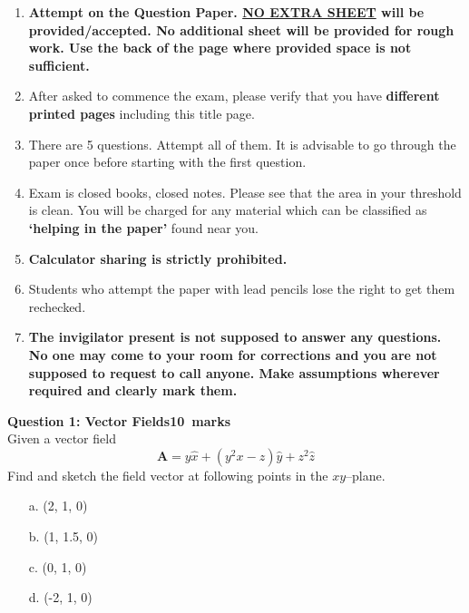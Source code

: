 \documentclass[12pt,a4paper]{article}
\def\QOne{10}
\begin{document}
\begin{enumerate}
\item \textbf{Attempt on the Question Paper. \underline{NO EXTRA SHEET} will be provided/accepted. No
additional sheet will be provided for rough work. Use the back of the page where
provided space is not sufficient.}
\item After asked to commence the exam, please verify that you have \textbf{\pageref{LastPage} different
printed pages} including this title page.
\item There are 5 questions. Attempt all of them. It is advisable to go through the paper once
before starting with the first question.
\item Exam is closed books, closed notes. Please see that the area in your threshold is clean.
You will be charged for any material which can be classified as \textbf{`helping in the paper'}
found near you.
\item \textbf{Calculator sharing is strictly prohibited.}
\item Students who attempt the paper with lead pencils lose the right to get them rechecked.
\item \textbf{The invigilator present is not supposed to answer any questions. No one may come
to your room for corrections and you are not supposed to request to call anyone.
Make assumptions wherever required and clearly mark them.}
\end{enumerate}
\newpage
\noindent\textbf{Question 1: Vector Fields\hfill \QOne~marks}\\
Given a vector field
\begin{equation*}
\textbf{A}=y\hat x+(y^2x-z)\hat y+z^2\hat z
\end{equation*}
Find and sketch the field vector at following points in the $xy$--plane.
\begin{enumerate}
\item[a.] (2, 1, 0)
\item[b.] (1, 1.5, 0)
\item[c.] (0, 1, 0)
\item[d.] (-2, 1, 0)
\end{enumerate}
\begin{figure}[H]
\end{figure}
\end{document}

